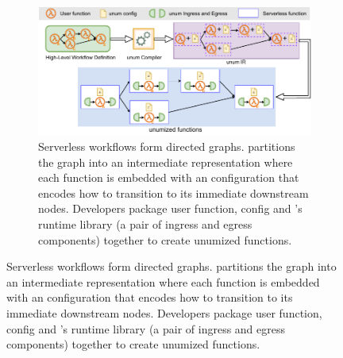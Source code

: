 \begin{figure}[t!]
	\centering
	\begin{subfigure}[t]{0.8\textwidth}
	\centering
		\includegraphics[width=0.8\columnwidth]{figures/unum-arch-compile-time.pdf}
		\caption{Serverless workflows form directed graphs. \name{}
		partitions the graph into an intermediate representation where each
		function is embedded with an \name{} configuration that encodes how to
		transition to its immediate downstream nodes. Developers package user
		function, \name{} config and \name{}'s runtime library (a pair of
		ingress and egress components) together to create unumized functions.}
		\label{fig:arch:unum-compile-time}


\end{subfigure}
\end{figure}
